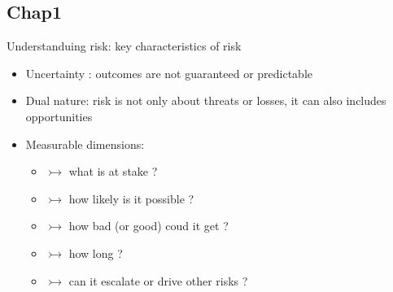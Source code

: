 \documentclass[aspectratio=169, 10pt]{beamer} %
\begin{document}
\subsection{Chap1}
\begin{frame}{Understanduing risk: key characteristics of risk}
    \begin{itemize}
        \item [$\bullet$] Uncertainty : outcomes are not guaranteed or predictable
         \medskip 

                 \item [$\bullet$] Dual nature: risk is not only about threats or losses,
                  it can also includes opportunities          \medskip 

                                  \item [$\bullet$] Measurable dimensions: 
    \begin{itemize}
        \item [$\bullet$]  $\rightarrowtail $ what is at stake ? 
         \medskip 
          \item [$\bullet$]  $\rightarrowtail $ how likely is it possible ? 
         \medskip 
          \item [$\bullet$]  $\rightarrowtail $ how bad (or good) coud it get ? 
         \medskip 
          \item [$\bullet$]  $\rightarrowtail $ how long ? 
         \medskip 
          \item [$\bullet$]  $\rightarrowtail $ can it escalate or drive
          other risks ? 
         \medskip 
    \end{itemize}

    \end{itemize}
\end{frame}
\end{document}
